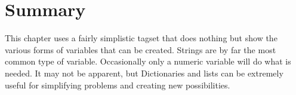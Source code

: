 \section{Summary}
This chapter uses a fairly simplistic tagset that does
nothing but show the various forms of variables that
can be created.  Strings are by far the most common
type of variable.  Occasionally only a numeric variable
will do what is needed.  It may not be apparent, but 
Dictionaries and lists can be extremely useful for
simplifying problems and creating new possibilities.

